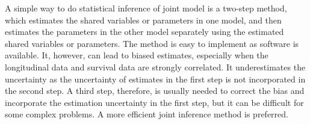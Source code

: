 A simple way to do statistical inference of joint model is a two-step method, which estimates the shared variables or parameters in one model, and then estimates the parameters in the other model separately using the estimated shared variables or parameters. The method is easy to implement as software is  available. It, however, can lead to biased estimates, especially when the longitudinal data and survival data are strongly correlated. It underestimates the uncertainty as the uncertainty of estimates in the first step is not incorporated in the second step. A third step, therefore, is usually needed to correct the bias and incorporate the estimation uncertainty in the first step, but it can be difficult for some complex problems.  
%
A more efficient joint inference method is preferred.


